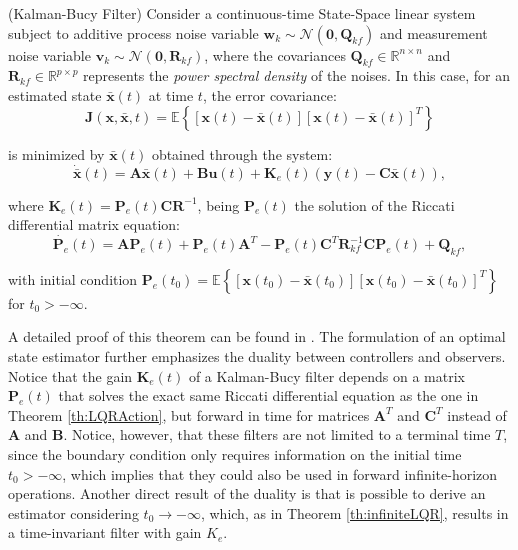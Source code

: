 \documentclass[a4paper,11pt]{book}
\numberwithin{figure}{chapter}
\numberwithin{equation}{chapter}
\numberwithin{table}{chapter}
\newtheorem{theorem}{Theorem}[chapter]
\theoremstyle{definition}
\newcounter{boxed-theorem}
\newenvironment{boxed-theorem}[1]
{\colorlet{shadecolor}{pastelBlue2!5} \begin{shaded} \begin{theorem}{#1}}
{\end{theorem} \end{shaded}}
\newcounter{boxed-lemma}
\newcounter{boxed-definition}
\newcounter{boxed-example}
\begin{document}
\begin{boxed-theorem}{(Kalman-Bucy Filter)} \label{th:kalmanBucy}
    Consider a continuous-time State-Space linear system subject to additive process noise variable $\bm{w}_k \sim \mathcal{N}(\bm{0}, \bm{Q}_{kf})$ and measurement noise variable $\bm{v}_k \sim \mathcal{N}(\bm{0}, \bm{R}_{kf})$, where the covariances $\bm{Q}_{kf} \in \mathbb{R}^{n \times n}$  and $\bm{R}_{kf} \in \mathbb{R}^{p \times p}$ represents the \emph{power spectral density} of the noises. In this case, for an estimated state $\bar{\bm{x}}(t)$ at time $t$, the error covariance:
    \begin{equation}
        \bm{J}(\bm{x}, \bar{\bm{x}}, t) = \mathbb{E}\left\{ [\bm{x}(t) - \bar{\bm{x}}(t)][\bm{x}(t) - \bar{\bm{x}}(t)]^T \right\}
    \end{equation}
    
    \noindent is minimized by $\bar{\bm{x}}(t)$ obtained through the system:
    \begin{equation}
        \dot{\bar{\bm{x}}}(t) = \bm{A} \bar{\bm{x}}(t) + \bm{B} \bm{u}(t) + \bm{K}_{e}(t) \left( \bm{y}(t) - \bm{C} \bar{\bm{x}}(t) \right)
    ,\end{equation}
    
    \noindent where $\bm{K}_e(t) = \bm{P}_e(t)\bm{C}\bm{R}^{-1}$, being $\bm{P}_e(t)$ the solution of the Riccati differential matrix equation:
    \begin{equation}
        \dot{\bm{P}_e}(t) = \bm{A} \bm{P}_e(t) + \bm{P}_e(t) \bm{A}^T - \bm{P}_e(t)\bm{C}^T\bm{R}_{kf}^{-1} \bm{C} \bm{P}_e(t) + \bm{Q}_{kf}
    ,\end{equation}
    
    \noindent with initial condition $\bm{P}_e(t_0) = \mathbb{E} \left\{ [\bm{x}(t_0) - \bar{\bm{x}}(t_0)][\bm{x}(t_0) - \bar{\bm{x}}(t_0)]^T \right\}$ for $t_0 > -\infty$.
\end{boxed-theorem}

A detailed proof of this theorem can be found in \cite{Crassidis:2011}. The formulation of an optimal state estimator further emphasizes the duality between controllers and observers. Notice that the gain $\bm{K}_e(t)$ of a Kalman-Bucy filter depends on a matrix $\bm{P}_e(t)$ that solves the exact same Riccati differential equation as the one in Theorem \ref{th:LQRAction}, but forward in time for matrices $\bm{A}^T$ and $\bm{C}^T$ instead of $\bm{A}$ and $\bm{B}$. Notice, however, that these filters are not limited to a terminal time $T$, since the boundary condition only requires information on the initial time $t_0 > -\infty$, which implies that they could also be used in forward infinite-horizon operations. Another direct result of the duality is that is possible to derive an estimator considering $t_0 \to -\infty$, which, as in Theorem \ref{th:infiniteLQR}, results in a time-invariant filter with gain $K_e$.
\end{document}
